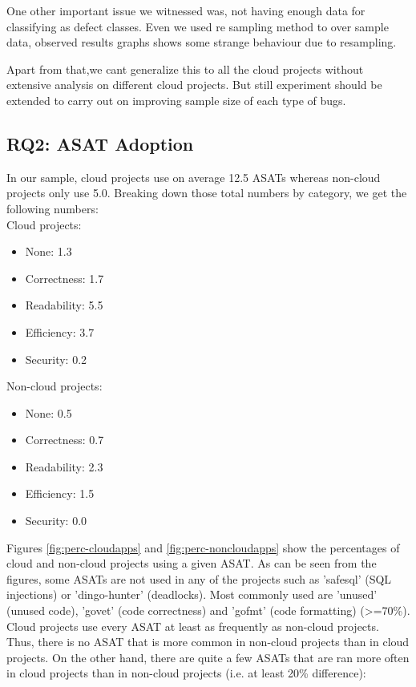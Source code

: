 \documentclass{seal_article}
\begin{document}
One other important issue we witnessed was, not having enough data for classifying as defect classes. Even we used re sampling method to over sample data, observed results graphs shows some strange behaviour due to resampling. 

Apart from that,we cant generalize this to all the cloud projects without extensive analysis on different cloud projects. But still experiment should be extended to carry out on improving sample size of each type of bugs.


\subsection{RQ2: ASAT Adoption}
In our sample, cloud projects use on average 12.5 ASATs whereas non-cloud projects only use 5.0. Breaking down those total numbers by category, we get the following numbers:\\

Cloud projects:
\begin{itemize}
    \item None:  1.3
    \item Correctness:  1.7
    \item Readability:  5.5
    \item Efficiency:  3.7
    \item Security:  0.2
\end{itemize}

Non-cloud projects:
\begin{itemize}
    \item None:  0.5
    \item Correctness:  0.7
    \item Readability:  2.3
    \item Efficiency:  1.5
    \item Security: 0.0
\end{itemize}

Figures \ref{fig:perc-cloudapps} and \ref{fig:perc-noncloudapps} show the percentages of cloud and non-cloud projects using a given ASAT. As can be seen from the figures, some ASATs are not used in any of the projects such as 'safesql' (SQL injections) or 'dingo-hunter' (deadlocks). Most commonly used are 'unused' (unused code), 'govet' (code correctness) and 'gofmt' (code formatting) (>=70\%). Cloud projects use every ASAT at least as frequently as non-cloud projects. Thus, there is no ASAT that is more common in non-cloud projects than in cloud projects. On the other hand, there are quite a few ASATs that are ran more often in cloud projects than in non-cloud projects (i.e. at least 20\% difference):
\end{document}
